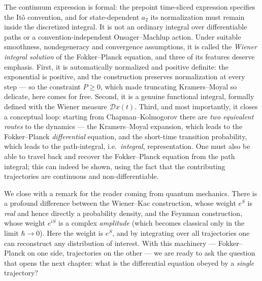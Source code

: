 The continuum expression is formal: the prepoint time-sliced expression specifies the It\^o convention, and for state-dependent $a_2$ its normalization must remain inside the discretized integral.
It is not an ordinary integral over differentiable paths or a convention-independent Onsager--Machlup action.
Under suitable smoothness, nondegeneracy and convergence assumptions, it is called the \emph{Wiener integral solution} of the Fokker--Planck equation, and three of its features deserve emphasis.
First, it is automatically normalized and positive definite: the exponential is positive, and the construction preserves normalization at every step --- so the constraint $P\ge0$, which made truncating Kramers--Moyal so delicate, here comes for free.
Second, it is a genuine functional integral, formally defined with the Wiener measure $\mathcal{D}x(t)$.
Third, and most importantly, it closes a conceptual loop: starting from Chapman--Kolmogorov there are \emph{two equivalent routes} to the dynamics --- the Kramers--Moyal expansion, which leads to the Fokker--Planck \emph{differential} equation, and the short-time transition probability, which leads to the path-integral, i.e.\ \emph{integral}, representation.
One must also be able to travel back and recover the Fokker--Planck equation from the path integral; this can indeed be shown, using the fact that the contributing trajectories are continuous and non-differentiable.

We close with a remark for the reader coming from quantum mechanics.
There is a profound difference between the Wiener--Kac construction, whose weight $e^{S}$ is \emph{real} and hence directly a probability density, and the Feynman construction, whose weight $e^{iS}$ is a complex \emph{amplitude} (which becomes classical only in the limit $\hbar\to0$).
Here the weight is $e^{S}$, and by integrating over all trajectories one can reconstruct any distribution of interest.
With this machinery --- Fokker--Planck on one side, trajectories on the other --- we are ready to ask the question that opens the next chapter: what is the differential equation obeyed by a \emph{single} trajectory?
